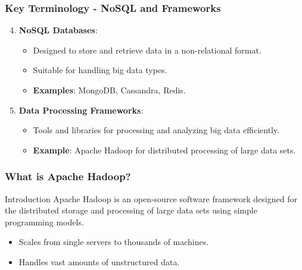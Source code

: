 \documentclass[aspectratio=169]{beamer}
\begin{document}
\begin{frame}[fragile]
    \frametitle{Key Terminology - NoSQL and Frameworks}
    \begin{enumerate}
        \setcounter{enumi}{3}
        \item \textbf{NoSQL Databases}:
            \begin{itemize}
                \item Designed to store and retrieve data in a non-relational format.
                \item Suitable for handling big data types.
                \item \textbf{Examples}: MongoDB, Cassandra, Redis.
            \end{itemize}
        \item \textbf{Data Processing Frameworks}:
            \begin{itemize}
                \item Tools and libraries for processing and analyzing big data efficiently.
                \item \textbf{Example}: Apache Hadoop for distributed processing of large data sets.
            \end{itemize}
    \end{enumerate}
\end{frame}

\begin{frame}[fragile]
    \frametitle{What is Apache Hadoop?}
    \begin{block}{Introduction}
        Apache Hadoop is an open-source software framework designed for the distributed storage and processing of large data sets using simple programming models.
    \end{block}
    \begin{itemize}
        \item Scales from single servers to thousands of machines.
        \item Handles vast amounts of unstructured data.
    \end{itemize}
\end{frame}
\end{document}
